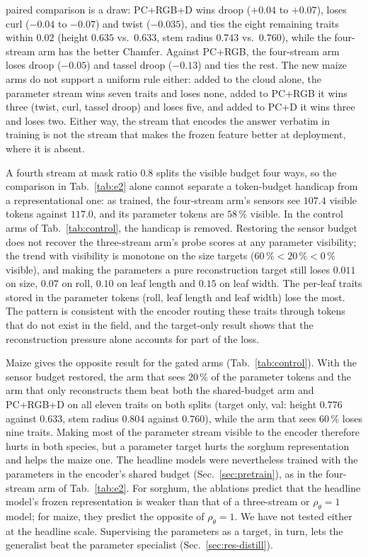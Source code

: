 paired comparison is a draw: PC+RGB+D wins droop ($+0.04$ to $+0.07$), loses
curl ($-0.04$ to $-0.07$) and twist ($-0.035$), and ties the eight remaining
traits within $0.02$ (height $0.635$ vs.\ $0.633$, stem radius $0.743$ vs.\
$0.760$), while the four-stream arm has the better Chamfer. Against PC+RGB, the
four-stream arm loses droop ($-0.05$) and tassel droop ($-0.13$) and ties the
rest. The new maize arms do not support a uniform rule either: added to the
cloud alone, the parameter stream wins seven traits and loses none, added to
PC+RGB it wins three (twist, curl, tassel droop) and loses five, and added to
PC+D it wins three and loses two. Either way, the stream that encodes the answer verbatim in training is not
the stream that makes the frozen feature better at deployment, where it is
absent.

A fourth stream at mask ratio $0.8$ splits the visible budget four ways, so
the comparison in Tab.~\ref{tab:e2} alone cannot separate a token-budget
handicap from a representational one: as trained, the four-stream arm's sensors
see $107.4$ visible tokens against $117.0$, and its parameter tokens are
$58\,\%$ visible. In the control arms of Tab.~\ref{tab:control}, the handicap
is removed. Restoring the sensor budget does not recover the three-stream arm's
probe scores at any parameter visibility; the trend with visibility is monotone
on the size targets ($60\,\% < 20\,\% < 0\,\%$ visible), and making the
parameters a pure reconstruction target still loses $0.011$ on size, $0.07$ on
roll, $0.10$ on leaf length and $0.15$ on leaf width. The per-leaf traits stored
in the parameter tokens (roll, leaf length and leaf width) lose the most. The
pattern is consistent with the encoder routing these traits through tokens that
do not exist in the field, and the target-only result shows that the
reconstruction pressure alone accounts for part of the loss.

Maize gives the opposite result for the gated arms (Tab.~\ref{tab:control}).
With the sensor budget restored, the arm that sees 20\,\% of the parameter
tokens and the arm that only reconstructs them beat both the shared-budget arm
and PC+RGB+D on all eleven traits on both splits (target only, val: height
$0.776$ against $0.633$, stem radius $0.804$ against $0.760$), while the arm
that sees 60\,\% loses nine traits. Making most of the parameter stream visible
to the encoder therefore hurts in both species, but a parameter target hurts the
sorghum representation and helps the maize one. The headline models were
nevertheless trained with the parameters in the encoder's shared budget
(Sec.~\ref{sec:pretrain}), as in the four-stream arm of Tab.~\ref{tab:e2}. For
sorghum, the ablations predict that the headline model's frozen representation
is weaker than that of a three-stream or $\rho_\theta{=}1$ model; for maize,
they predict the opposite of $\rho_\theta{=}1$. We have not tested either at the
headline scale. Supervising the parameters as a target, in turn, lets
the generalist beat the parameter specialist (Sec.~\ref{sec:res-distill}).

